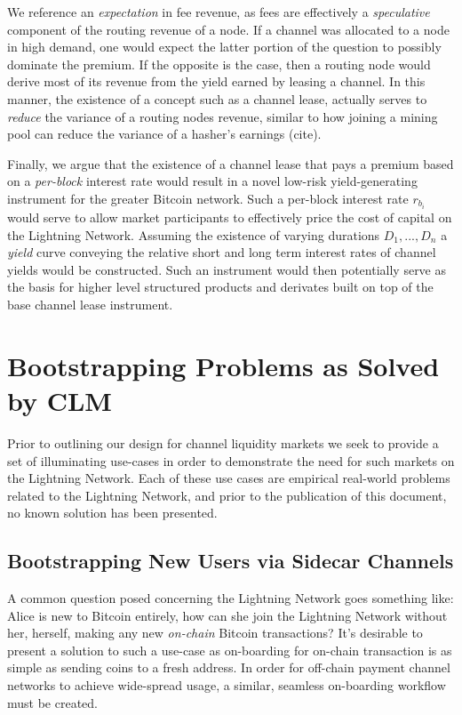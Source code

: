 \documentclass[12pt,a4paper]{article}
\theoremstyle{definition}
\begin{document}
We reference an \emph{expectation} in fee revenue, as fees are effectively a
\emph{speculative} component of the routing revenue of a node. If a channel was
allocated to a node in high demand, one would expect the latter portion of the
question to possibly dominate the premium. If the opposite is the case, then a
routing node would derive most of its revenue from the yield earned by leasing
a channel. In this manner, the existence of a concept such as a channel lease,
actually serves to \emph{reduce} the variance of a routing nodes revenue,
similar to how joining a mining pool can reduce the variance of a hasher's
earnings (cite). 

Finally, we argue that the existence of a channel lease that pays a premium
based on a \emph{per-block} interest rate would result in a novel low-risk
yield-generating instrument for the greater Bitcoin network. Such a per-block
interest rate $r_{b_i}$ would serve to allow market participants to effectively
price the cost of capital on the Lightning Network. Assuming the existence of
varying durations ${D_1, ..., D_n}$ a \emph{yield} curve conveying the relative
short and long term interest rates of channel yields would be constructed. Such
an instrument would then potentially serve as the basis for higher level
structured products and derivates built on top of the base channel lease
instrument. 


\section{Bootstrapping Problems as Solved by CLM}

Prior to outlining our design for channel liquidity markets we seek to provide
a set of illuminating use-cases in order to demonstrate the need for such
markets on the Lightning Network. Each of these use cases are empirical
real-world problems related to the Lightning Network, and prior to the
publication of this document, no known solution has been presented. 

\subsection{Bootstrapping New Users via Sidecar Channels}

A common question posed concerning the Lightning Network goes something like:
Alice is new to Bitcoin entirely, how can she join the Lightning Network
without her, herself, making any new \emph{on-chain} Bitcoin transactions? It's
desirable to present a solution to such a use-case as on-boarding for on-chain
transaction is as simple as sending coins to a fresh address. In order for
off-chain payment channel networks to achieve wide-spread usage, a similar,
seamless on-boarding workflow must be created.
\end{document}
